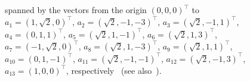 \documentclass[%
  twocolumn,
 showpacs,
 showkeys,
 preprintnumbers,
 amsmath,amssymb,
 aps,
  pra,
  longbibliography,
 floatfix,
 ]{revtex4-1}
\begin{document}
\begin{figure}
{spanned by  the vectors from the origin $\left(0,0,0\right)^\intercal$ to
$a_{1}     = \left(    1,\sqrt{2},0     \right)^\intercal $,
$a_{2}     = \left(\sqrt{2}, -1, -3 \right)^\intercal $,
$a_{3}     = \left(   \sqrt{2},-1,1     \right)^\intercal $,
$a_{4}     = \left(    0,1,1     \right)^\intercal $,
$a_{5}     = \left(   \sqrt{2},1,-1     \right)^\intercal $,
$a_{6}     = \left(\sqrt{2}, 1, 3 \right)^\intercal $,
$a_{7}     = \left(    -1,\sqrt{2},0     \right)^\intercal $,
$a_{8}     = \left(\sqrt{2}, 1, -3 \right)^\intercal $,
$a_{9}     = \left(   \sqrt{2},1,1     \right)^\intercal $,
$a_{10}     = \left(    0,1,-1     \right)^\intercal $,
$a_{11}     = \left(   \sqrt{2},-1,-1     \right)^\intercal $,
$a_{12}     = \left(\sqrt{2}, -1, 3 \right)^\intercal $,
$a_{13}     = \left(    1,0,0     \right)^\intercal $,
respectively~\cite[p.~206, Fig.~1]{tkadlec-96}
(see also~\cite[Fig.~4, p.~5387]{svozil-tkadlec}).
%
%
%
}
\end{figure}
\end{document}
